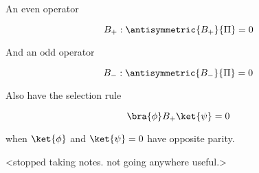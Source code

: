 An even operator

\begin{equation}\label{eqn:qmTwoR1:n}
B_{+} : \antisymmetric{B_{+}}{\Pi} = 0
\end{equation}

And an odd operator

\begin{equation}\label{eqn:qmTwoR1:n}
B_{-} : \antisymmetric{B_{-}}{\Pi} = 0
\end{equation}

Also have the selection rule

\begin{equation}\label{eqn:qmTwoR1:n}
\bra{\phi} B_{+} \ket{\psi} = 0
\end{equation}

when $\ket{\phi}$ and $\ket{\psi} = 0$ have opposite parity.

<stopped taking notes.  not going anywhere useful.>


\EndArticle
